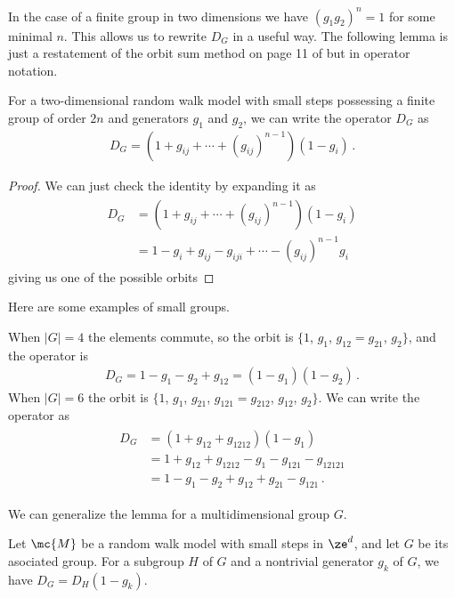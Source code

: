 In the case of a finite group in two dimensions we have $(g_1g_2)^n = 1$ for some minimal $n$. This allows us to rewrite $D_G$ in a useful way. The following lemma is just a restatement of the orbit sum method on page 11 of \cite{bousquet2010walks} but in operator notation.
\begin{lemma} For a two-dimensional random walk model with small steps possessing a finite group of order $2n$ and generators $g_1$ and $g_2$, we can write the operator $D_G$ as
\begin{align}
	D_G = (1+g_{ij}+\cdots+(g_{ij})^{n-1})(1-g_i)\,.
\end{align}
\end{lemma}
\begin{proof} We can just check the identity by expanding it as
\begin{align}\begin{split}
	D_G &= (1+g_{ij}+\cdots+(g_{ij})^{n-1})(1-g_i)\\
	        &= 1- g_i +g_{ij}-g_{iji} + \cdots - (g_{ij})^{n-1}g_i
\end{split}\end{align}
giving us one of the possible orbits
\end{proof}
Here are some examples of small groups.
\begin{example} When $|G| = 4$ the elements commute, so the orbit is $\{1$, $g_1$, $g_{12} = g_{21}$, $g_2\}$, and the operator is
\begin{align}
	D_G = 1 - g_1 - g_2 + g_{12} = (1-g_1)(1-g_2)\,.
\end{align}
When $|G| = 6$ the orbit is $\{1$, $g_1$, $g_{21}$, $g_{121}=g_{212}$, $g_{12}$, $g_2\}$. We can write the operator as
\begin{align}\begin{split}
	D_G &= (1+g_{12}+g_{1212})(1-g_1) \\
	&=  1+g_{12}+g_{1212} - g_1 - g_{121} - g_{12121} \\
	&= 1 -g_1 - g_2 + g_{12}+g_{21}-g_{121}\,.
\end{split}\end{align}
\end{example}
We can generalize the lemma for a multidimensional group $G$.
\begin{lemma}Let $\mc{M}$ be a random walk model with small steps in $\ze^d$, and let $G$ be its asociated group. For a subgroup $H$ of $G$ and a nontrivial generator $g_k$ of $G$, we have $D_G = D_H(1-g_k)$.
\end{lemma}
